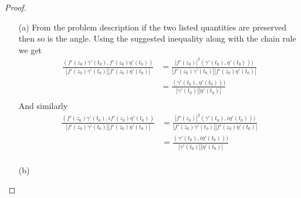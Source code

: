 \documentclass[10pt]{article}
\newcommand{\sk}{\vskip 10mm}
\theoremstyle{remark}
\theoremstyle{remark}
\begin{document}
\begin{proof}
  \begin{enumerate}
  \item[(a)] From the problem description if the two listed quantities are
    preserved then so is the angle. Using the suggested inequality along
    with the chain rule we get
    \begin{align*}
      \frac{(f'(z_0)\gamma'(t_0),f'(z_0)\eta'(t_0))}{|f'(z_0)\gamma'(t_0)||f'(z_0)\eta'(t_0)|}&=\frac{|f'(z_0)|^2(\gamma'(t_0),\eta'(t_0)))}{|f'(z_0)\gamma'(t_0)||f'(z_0)\eta'(t_0)|}\\
      &= \frac{(\gamma'(t_0),\eta'(t_0)))}{|\gamma'(t_0)||\eta'(t_0)|}\\
    \end{align*}
    And similarly
    \begin{align*}
      \frac{(f'(z_0)\gamma'(t_0),if'(z_0)\eta'(t_0))}{|f'(z_0)\gamma'(t_0)||f'(z_0)\eta'(t_0)|}&=\frac{|f'(z_0)|^2(\gamma'(t_0),i\eta'(t_0)))}{|f'(z_0)\gamma'(t_0)||f'(z_0)\eta'(t_0)|}\\
      &= \frac{(\gamma'(t_0),i\eta'(t_0)))}{|\gamma'(t_0)||\eta'(t_0)|}\\
    \end{align*}
  \item[(b)]
  \end{enumerate}
\end{proof}

\sk

\end{document}
